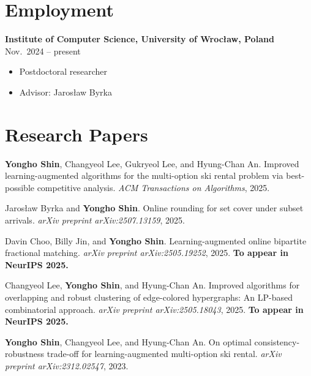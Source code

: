\documentclass{article}
\newcommand{\killinitspace}{-0.7em}
\begin{document}
\section{Employment}
\textbf{Institute of Computer Science, University of Wrocław, Poland} \hfill Nov.~2024 -- present
\vspace{\killinitspace}
\begin{itemize}
\item Postdoctoral researcher
\item Advisor: Jarosław Byrka
\end{itemize}

\section{Research Papers}
\textbf{Yongho Shin}, Changyeol Lee, Gukryeol Lee, and Hyung-Chan An. Improved learning-augmented algorithms for the multi-option ski rental problem via best-possible competitive analysis. \emph{ACM Transactions on Algorithms}, 2025.

Jaros{\l}aw Byrka and \textbf{Yongho Shin}. Online rounding for set cover under subset arrivals. \emph{arXiv preprint arXiv:2507.13159}, 2025.

Davin Choo, Billy Jin, and \textbf{Yongho Shin}. Learning-augmented online bipartite fractional matching. \emph{arXiv preprint arXiv:2505.19252}, 2025. \textbf{To appear in NeurIPS 2025.}

Changyeol Lee, \textbf{Yongho Shin}, and Hyung-Chan An. Improved algorithms for overlapping and robust clustering of edge-colored hypergraphs: An LP-based combinatorial approach. \emph{arXiv preprint arXiv:2505.18043}, 2025. \textbf{To appear in NeurIPS 2025.}

\textbf{Yongho Shin}, Changyeol Lee, and Hyung-Chan An. On optimal consistency-robustness trade-off for learning-augmented multi-option ski rental. \emph{arXiv preprint arXiv:2312.02547}, 2023.
\end{document}
